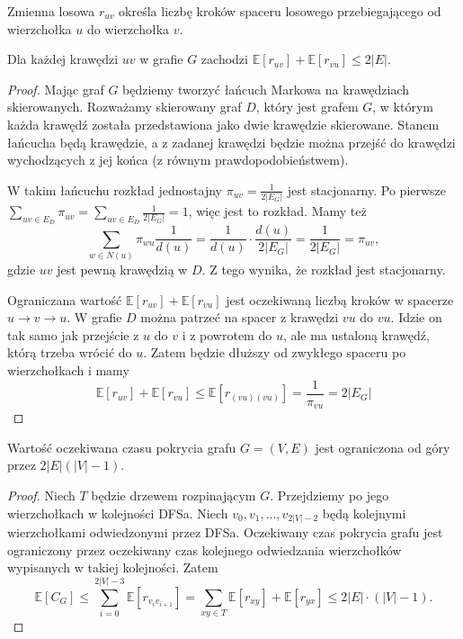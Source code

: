\begin{definition}
	Zmienna losowa \(r_{uv}\) określa liczbę kroków spaceru losowego przebiegającego od wierzchołka \(u\) do wierzchołka \(v\).
\end{definition}

\begin{lemma}
	Dla każdej krawędzi \(uv\) w grafie \(G\) zachodzi \(\mathbb{E}\left[ r_{uv} \right] + \mathbb{E}\left[ r_{vu} \right] \le 2 |E| \).
\end{lemma}
\begin{proof}
	Mając graf \(G\) będziemy tworzyć łańcuch Markowa na krawędziach skierowanych. Rozważamy skierowany graf \(D\), który jest grafem \(G\), w którym każda krawędź została przedstawiona jako dwie krawędzie skierowane. Stanem łańcucha będą krawędzie, a z zadanej krawędzi będzie można przejść do krawędzi wychodzących z jej końca (z równym prawdopodobieństwem).

	W takim łańcuchu rozkład jednostajny \(\pi_{uv} = \frac{1}{2 |E_G| }\) jest stacjonarny. Po pierwsze \( \sum_{uv \in E_D }^{} \pi_{uv} = \sum_{uv \in E_D }^{} \frac{1}{2 |E_G| } = 1\), więc jest to rozkład.
	Mamy też \[ \sum_{w\in N\left( u  \right) }^{} \pi_{wu} \frac{1}{d\left( u \right) } = \frac{1}{d\left( u  \right) }\cdot \frac{d\left( u  \right) }{2 |E_G| } = \frac{1}{2|E_G| } = \pi_{uv},\]
	gdzie \(uv\) jest pewną krawędzią w \(D\). Z tego wynika, że rozkład jest stacjonarny.

	Ograniczana wartość \(\mathbb{E}\left[ r_{uv} \right] + \mathbb{E}\left[ r_{vu} \right] \) jest oczekiwaną liczbą kroków w spacerze \(u \to v \to u \). W grafie \(D\) można patrzeć na spacer z krawędzi \(vu\) do \(vu\). Idzie on tak samo jak przejście z \(u\) do \(v\) i z powrotem do \(u\), ale ma ustaloną krawędź, którą trzeba wrócić do \(u\). Zatem będzie dłuższy od zwykłego spaceru po wierzchołkach i mamy
	\[ \mathbb{E}\left[ r_{uv} \right] + \mathbb{E}\left[ r_{vu} \right] \le \mathbb{E}\left[ r_{(vu)(vu)} \right] = \frac{1}{\pi_{vu}} = 2|E_G| \]
\end{proof}

\begin{theorem}[Twierdzenie 7.15 P\&C] Wartość oczekiwana czasu pokrycia grafu \( G = (V, E) \) jest ograniczona od góry przez \( 2|E|\left( |V|-1 \right)  \).
\end{theorem}
\begin{proof}
	Niech \(T\) będzie drzewem rozpinającym \(G\). Przejdziemy po jego wierzchołkach w kolejności DFSa. Niech \(v_0,v_1,\ldots,v_{2\left|V\right|-2}\) będą kolejnymi wierzchołkami odwiedzonymi przez DFSa. Oczekiwany czas pokrycia grafu jest ograniczony przez oczekiwany czas kolejnego odwiedzania wierzchołków wypisanych w takiej kolejności. Zatem
	\[ \mathbb{E}\left[ C_G \right] \le \sum_{i=0}^{2\left|V\right|-3} \mathbb{E}\left[ r_{v_iv_{i+1}} \right] = \sum_{xy\in T}^{} \mathbb{E}\left[ r_{xy} \right] + \mathbb{E}\left[ r_{yx} \right] \le 2|E|\cdot \left( \left|V\right|-1 \right)  .\]
\end{proof}

